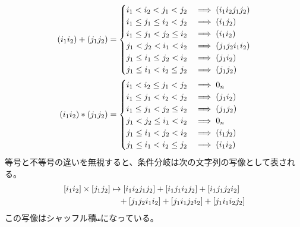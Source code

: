 	\begin{equation*}\begin{split} %
		\range{i_1i_2} + \range{j_1j_2} &= \begin{cases}
			i_1 < i_2 < j_1 < j_2 &\implies \range{i_1i_2j_1j_2} \\
			i_1 \le j_1 \le i_2 < j_2 &\implies \range{i_1j_2} \\
			i_1 \le j_1 < j_2 \le i_2 &\implies \range{i_1i_2} \\
			j_1 < j_2 < i_1 < i_2 &\implies \range{j_1j_2i_1i_2} \\
			j_1 \le i_1 \le j_2 < i_2 &\implies \range{j_1i_2} \\
			j_1 \le i_1 < i_2 \le j_2 &\implies \range{j_1j_2} \\
		\end{cases} \\	
		\range{i_1i_2} * \range{j_1j_2} &= \begin{cases}
			i_1 < i_2 \le j_1 < j_2 &\implies 0_n \\
			i_1 \le j_1 < i_2 < j_2 &\implies \range{j_1i_2} \\
			i_1 \le j_1 < j_2 \le i_2 &\implies \range{j_1j_2} \\
			j_1 < j_2 \le i_1 < i_2 &\implies 0_n \\
			j_1 \le i_1 < j_2 < i_2 &\implies \range{i_1j_2} \\
			j_1 \le i_1 < i_2 \le j_2 &\implies \range{i_1i_2} \\
		\end{cases} \\
	\end{split}\end{equation*} %
	等号と不等号の違いを無視すると、条件分岐は次の文字列の写像として表される。
	\begin{equation*}\begin{split} %
		\word{i_1i_2} \times \word{j_1j_2} &\mapsto \word{i_1i_2j_1j_2}
			+ \word{i_1j_1i_2j_2} + \word{i_1j_1j_2i_2} \\
			&\quad+ \word{j_1j_2i_1i_2}
			+ \word{j_1i_1j_2i_2} + \word{j_1i_1i_2j_2}
	\end{split}\end{equation*} %
	この写像はシャッフル積$\shuffle$になっている。

